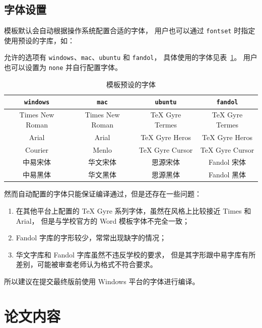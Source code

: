 \documentclass[a4paper]{ltxdoc}
\makeatletter
\DeclareRobustCommand\opt{\texttt}
\def\DescribeOption{\leavevmode\@bsphack\begingroup\MakePrivateLetters
  \Describe@Option}
\def\Describe@Option#1{\endgroup
              \marginpar{\raggedleft\PrintDescribeOption{#1}}%
              \SpecialEnvIndex{#1}\@esphack\ignorespaces}
\makeatother
\begin{document}
\subsection{字体设置}
模板默认会自动根据操作系统配置合适的字体，
\DescribeOption{fontset}
用户也可以通过 \opt{fontset} 时指定使用预设的字库，如：
允许的选项有 \opt{windows}、\opt{mac}、\opt{ubuntu} 和 \opt{fandol}，
具体使用的字体见表~\ref{tab:fontset}。
用户也可以设置为 \opt{none} 并自行配置字体。

\begin{table}
  \centering
  \caption{模板预设的字体}
  \label{tab:fontset}
  \begin{tabular}{cccc}
    \toprule
    \opt{windows} & \opt{mac}    & \opt{ubuntu} & \opt{fandol} \\
    \midrule
    Times New Roman  & Times New Roman & TeX Gyre Termes & TeX Gyre Termes \\
    Arial            & Arial           & TeX Gyre Heros  & TeX Gyre Heros  \\
    Courier          & Menlo           & TeX Gyre Cursor & TeX Gyre Cursor \\
    中易宋体         & 华文宋体        & 思源宋体        & Fandol 宋体     \\
    中易黑体         & 华文黑体        & 思源黑体        & Fandol 黑体     \\
    \bottomrule
  \end{tabular}
\end{table}

然而自动配置的字体只能保证编译通过，但是还存在一些问题：
\begin{enumerate}
  \item 在其他平台上配置的 TeX Gyre 系列字体，虽然在风格上比较接近 Times 和 Arial，
    但是与学校官方的 Word 模板字体不完全一致；
  \item Fandol 字库的字形较少，常常出现缺字的情况；
  \item 华文字库和 Fandol 字库虽然不违反学校的要求，
    但是其字形跟中易字库有所差别，可能被审查老师认为格式不符合要求。
\end{enumerate}

所以建议在提交最终版前使用 Windows 平台的字体进行编译。



\section{论文内容}
\end{document}
